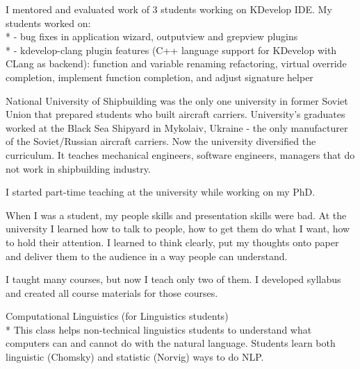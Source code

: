 \documentclass[12pt]{letter}
\begin{document}
\begin{llist}
           \item I mentored and evaluated work of 3 students working on KDevelop IDE. My students worked on:\\*
                  - bug fixes in application wizard, outputview and grepview plugins\\*
                  - kdevelop-clang plugin features (C++ language support for KDevelop with CLang as backend): function and variable renaming refactoring, virtual override completion, implement function completion, and adjust signature helper

  \endexperience






  \startexperience

            \item National University of Shipbuilding was the only one university in former Soviet Union that prepared students who built aircraft carriers. University's graduates worked at the Black Sea Shipyard in Mykolaiv, Ukraine - the only manufacturer of the Soviet/Russian aircraft carriers. Now the university diversified the curriculum. It teaches mechanical engineers, software engineers, managers that do not work in shipbuilding industry.

            \item I started part-time teaching at the university while working on my PhD.

            \item When I was a student, my people skills and presentation skills were bad. At the university I learned how to talk to people, how to get them do what I want, how to hold their attention. I learned to think clearly, put my thoughts onto paper and deliver them to the audience in a way people can understand.

            \item I taught many courses, but now I teach only two of them. I developed syllabus and created all course materials for those courses.

            \item Computational Linguistics (for Linguistics students)\\*
            This class helps non-technical linguistics students to understand what computers can and cannot do with the natural language. Students learn both linguistic (Chomsky) and statistic (Norvig) ways to do NLP.


\end{llist}
\end{document}

